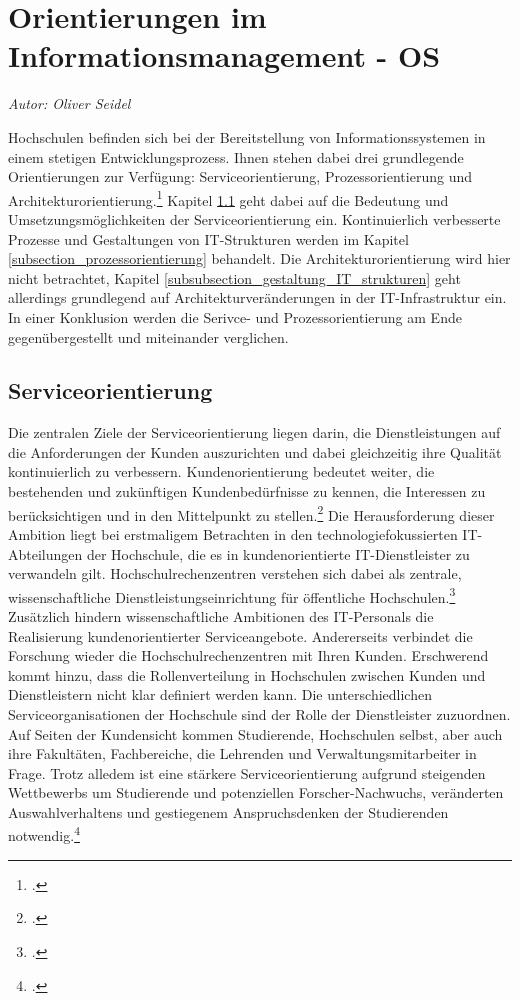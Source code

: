 \section{Orientierungen im Informationsmanagement - OS}
\textit{Autor: Oliver Seidel}

Hochschulen befinden sich bei der Bereitstellung von Informationssystemen in einem stetigen Entwicklungsprozess. Ihnen stehen dabei drei grundlegende Orientierungen zur Verfügung: Serviceorientierung, Prozessorientierung und Architekturorientierung.\footcite[Vgl.][32]{leitner_itil_2008} Kapitel \ref{subsection_serviceorientierung} geht dabei auf die Bedeutung und Umsetzungsmöglichkeiten der Serviceorientierung ein. Kontinuierlich verbesserte Prozesse und Gestaltungen von IT-Strukturen werden im Kapitel \ref{subsection_prozessorientierung} behandelt. Die Architekturorientierung wird hier nicht betrachtet, Kapitel \ref{subsubsection_gestaltung_IT_strukturen} geht allerdings grundlegend auf Architekturveränderungen in der IT-Infrastruktur ein. In einer Konklusion werden die Serivce- und Prozessorientierung am Ende gegenübergestellt und miteinander verglichen.


\subsection{Serviceorientierung}
\label{subsection_serviceorientierung}
Die zentralen Ziele der Serviceorientierung liegen darin, die Dienstleistungen auf die 
Anforderungen der Kunden auszurichten und dabei gleichzeitig ihre Qualität kontinuierlich 
zu verbessern. Kundenorientierung bedeutet weiter, die bestehenden und zukünftigen 
Kundenbedürfnisse zu kennen, die Interessen zu berücksichtigen und in den Mittelpunkt zu 
stellen.\footcite[Vgl.][34]{leitner_itil_2008} Die Herausforderung dieser Ambition liegt bei 
erstmaligem Betrachten in den technologiefokussierten IT-Abteilungen der Hochschule, die 
es in kundenorientierte IT-Dienstleister zu verwandeln gilt. Hochschulrechenzentren 
verstehen sich dabei als zentrale, wissenschaftliche Dienstleistungseinrichtung für 
öffentliche Hochschulen.\footcite[Vgl.][10]{schroeder_2011} Zusätzlich hindern 
wissenschaftliche Ambitionen des IT-Personals die Realisierung kundenorientierter 
Serviceangebote. Andererseits verbindet die Forschung wieder die Hochschulrechenzentren 
mit Ihren Kunden. Erschwerend kommt hinzu, dass die Rollenverteilung in Hochschulen 
zwischen Kunden und Dienstleistern nicht klar definiert werden kann. Die unterschiedlichen 
Serviceorganisationen der Hochschule sind der Rolle der Dienstleister zuzuordnen. Auf 
Seiten der Kundensicht kommen Studierende, Hochschulen selbst, aber auch ihre Fakultäten, 
Fachbereiche, die Lehrenden und Verwaltungsmitarbeiter in Frage. Trotz alledem ist eine 
stärkere Serviceorientierung aufgrund steigenden Wettbewerbs um Studierende und 
potenziellen Forscher-Nachwuchs, veränderten Auswahlverhaltens und gestiegenem 
Anspruchsdenken der Studierenden notwendig.\footcite[Vgl.][14]{leitner_itil_2008}

